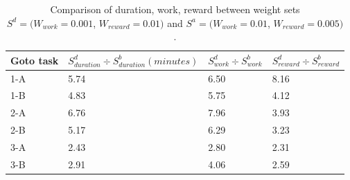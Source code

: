 \documentclass{tamuccthesis}
\begin{document}
\begin{table}[H]
    \begin{tabular}{|l|l|l|l|}
        \hline
        Goto task & $S^d_{duration} \div S^b_{duration} (minutes)$ & $S^d_{work} \div S^b_{work}$ & $S^d_{reward} \div S^b_{reward}$ \\
        \hline
        1-A & 5.74 & 6.50 & 8.16 \\
        \hline
        1-B & 4.83 & 5.75 & 4.12 \\
        \hline
        2-A & 6.76 & 7.96 & 3.93 \\
        \hline
        2-B & 5.17 & 6.29 & 3.23 \\
        \hline
        3-A & 2.43 & 2.80 & 2.31 \\
        \hline
        3-B & 2.91 & 4.06 & 2.59 \\
        \hline
    \end{tabular}
    \caption[Varying optimization criteria weights, weight sets $S^d$ and $S^b$.]{Comparison of duration, work, reward between weight sets $S^d = (W_{work} = 0.001$, $W_{reward} = 0.01)$ and $S^a = (W_{work} = 0.01$, $W_{reward} = 0.005)$.}
    \label{tbl:weightDiff_d_b}
\end{table}
\end{document}
